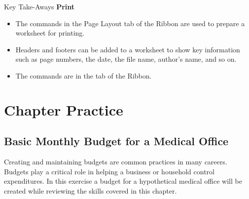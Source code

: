 \begin{center}
	\begin{tkwbox}{Key Take-Aways}
		\textbf{Print}
		\\
		\begin{itemize}
			\setlength{\itemsep}{0pt}
			\setlength{\parskip}{0pt}
			\setlength{\parsep}{0pt}

			\item The commands in the Page Layout tab of the Ribbon are used to prepare a worksheet for printing.
			\item Headers and footers can be added to a worksheet to show key information such as page numbers, the date, the file name, author's name, and so on.
			\item The  commands are in the  tab of the Ribbon.
			
		\end{itemize}
	\end{tkwbox}
\end{center}

\section{Chapter Practice}

\subsection{Basic Monthly Budget for a Medical Office}

Creating and maintaining budgets are common practices in many careers. Budgets play a critical role in helping a business or household control expenditures. In this exercise a budget for a hypothetical medical office will be created while reviewing the skills covered in this chapter.

